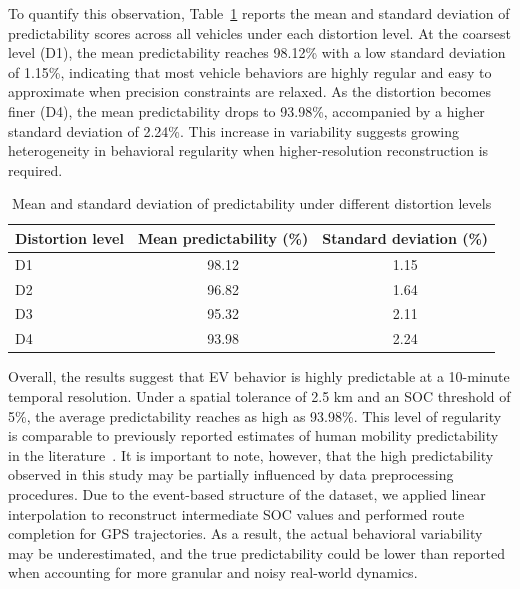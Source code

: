 \documentclass[12pt,review,authoryear]{elsarticle}
\theoremstyle{upright}
\begin{document}
To quantify this observation, Table~\ref{tab:predictability-stats} reports the mean and standard deviation of predictability scores across all vehicles under each distortion level. At the coarsest level (D1), the mean predictability reaches 98.12\% with a low standard deviation of 1.15\%, indicating that most vehicle behaviors are highly regular and easy to approximate when precision constraints are relaxed. As the distortion becomes finer (D4), the mean predictability drops to 93.98\%, accompanied by a higher standard deviation of 2.24\%. This increase in variability suggests growing heterogeneity in behavioral regularity when higher-resolution reconstruction is required.
\begin{table}[htbp!]
  \centering
  \caption{Mean and standard deviation of predictability under different distortion levels}
  \label{tab:predictability-stats}
  \vspace{4pt}
  \small
  \begin{tabular}{lcc}
    \toprule
    \textbf{Distortion level} & \textbf{Mean predictability (\%)} & \textbf{Standard deviation (\%)} \\
    \midrule
    D1 & 98.12 & 1.15 \\
    D2 & 96.82 & 1.64 \\
    D3 & 95.32 & 2.11 \\
    D4 & 93.98 & 2.24 \\
    \bottomrule
  \end{tabular}
\end{table}

Overall, the results suggest that EV behavior is highly predictable at a 10-minute temporal resolution. Under a spatial tolerance of 2.5 km and an SOC threshold of 5\%, the average predictability reaches as high as 93.98\%. This level of regularity is comparable to previously reported estimates of human mobility predictability in the literature~\citep{song2010limits}. It is important to note, however, that the high predictability observed in this study may be partially influenced by data preprocessing procedures. Due to the event-based structure of the dataset, we applied linear interpolation to reconstruct intermediate SOC values and performed route completion for GPS trajectories. As a result, the actual behavioral variability may be underestimated, and the true predictability could be lower than reported when accounting for more granular and noisy real-world dynamics.
\end{document}
